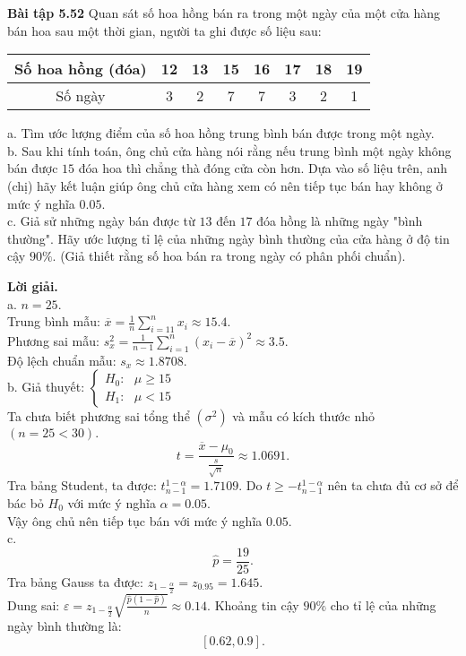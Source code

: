 \begin{mybox}
\textbf{Bài tập 5.52} Quan sát số hoa hồng bán ra trong một ngày của một cửa hàng bán hoa sau một thời gian, người ta ghi được số liệu sau:
\begin{table}[H]
\begin{tabular}{|c|c|c|c|c|c|c|c|}
\hline 
Số hoa hồng (đóa) & 12 & 13 & 15 & 16 & 17 & 18 & 19 \\ 
\hline 
Số ngày & 3 & 2 & 7 & 7 & 3 & 2 & 1 \\ 
\hline 
\end{tabular} 
\end{table}
a. Tìm ước lượng điểm của số hoa hồng trung bình bán được trong một ngày.\\
b. Sau khi tính toán, ông chủ cửa hàng nói rằng nếu trung bình một ngày không bán được $15$ đóa hoa thì chẳng thà đóng cửa còn hơn. Dựa vào số liệu trên, anh (chị) hãy kết luận giúp ông chủ cửa hàng xem có nên tiếp tục bán hay không ở mức ý nghĩa $0.05.$\\
c. Giả sử những ngày bán được từ $13$ đến $17$ đóa hồng là những ngày "bình thường". Hãy ước lượng tỉ lệ của những ngày bình thường của cửa hàng ở độ tin cậy $90\%.$ (Giả thiết rằng số hoa bán ra trong ngày có phân phối chuẩn).
\end{mybox}
\textbf{Lời giải.}\\
a. $n = 25.$\\
Trung bình mẫu:
$\overline x  = \frac{1}{n}\sum\limits_{i =1 1}^n {{x_i}}  \approx 15.4.$\\
Phương sai mẫu: $s_x^2 = \frac{1}{{n - 1}}\sum\limits_{i = 1}^n {{{\left( {{x_i} - \overline x } \right)}^2}}  \approx 3.5.$\\
Độ lệch chuẩn mẫu: ${s_x} \approx 1.8708.$\\
b. Giả thuyết: $\begin{cases}
H_0: \text{ } \mu \geqslant 15\\
H_1: \text{ } \mu < 15
\end{cases} $ \\
Ta chưa biết phương sai tổng thể $\left( {\sigma^2} \right)$ và mẫu có kích thước nhỏ $\left( {n = 25 < 30} \right).$
$$t = \frac{\overline{x} - \mu_0}{\frac{s}{\sqrt{n}}} \approx 1.0691.$$
Tra bảng Student, ta được: $t_{n - 1}^{1 - \alpha} = 1.7109.$
Do $ t \geqslant -t_{n - 1}^{1 - \alpha}$ nên ta chưa đủ cơ sở để bác bỏ $H_0$ với mức ý nghĩa $\alpha = 0.05.$\\
Vậy ông chủ nên tiếp tục bán với mức ý nghĩa $0.05.$\\
c. 
$$\widehat{p} = \frac{19}{25}.$$
Tra bảng Gauss ta được: $z_{1 - \frac{\alpha}{2}} = z_{0.95} = 1.645.$\\
Dung sai: $\varepsilon  = {z_{1 - \frac{\alpha }{2}}}\sqrt {\frac{{\widehat p\left( {1 - \widehat p} \right)}}{n}}  \approx 0.14.$
Khoảng tin cậy $90\%$ cho tỉ lệ của những ngày bình thường là: 
$$\left[ {0.62, 0.9} \right].$$

